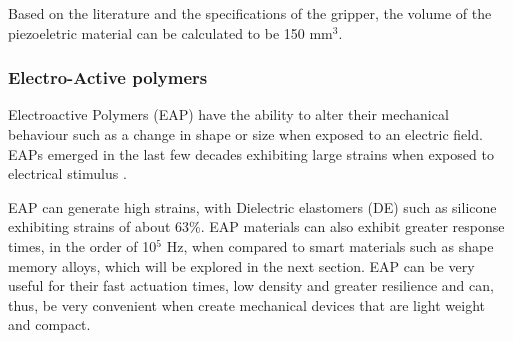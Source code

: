 Based on the literature and the specifications of the gripper, the volume of the piezoeletric material can be calculated to be 150 mm$^3$.

\subsubsection{Electro-Active polymers}
Electroactive Polymers (EAP) have the ability to alter their mechanical behaviour such as a change in shape or size when exposed to an electric field. EAPs emerged in the last few decades exhibiting large strains when exposed to electrical stimulus \cite{bar-cohen_artificial_2005}.

EAP can generate high strains, with Dielectric elastomers (DE) such as silicone exhibiting strains of about 63\%\cite{kornbluh_electroactive_2004}. EAP materials can also exhibit greater response times, in the order of 10$^5$ Hz, when compared to smart materials such as shape memory alloys, which will be explored in the next section. EAP can be very useful for their fast actuation times, low density and greater resilience and can, thus, be very convenient when create mechanical devices that are light weight and compact.
%

